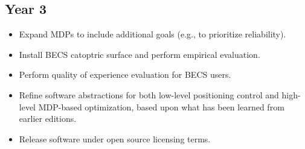 \subsection*{Year 3}

\begin{itemize}

\item Expand MDPs to include additional goals (e.g., to prioritize
reliability).

\item Install BECS catoptric surface and perform empirical evaluation.

\item Perform quality of experience evaluation for BECS users.

\item Refine software abstractions for both low-level positioning control
and high-level MDP-based optimization, based upon what has been learned
from earlier editions.

\item Release software under open source licensing terms.

\end{itemize}
